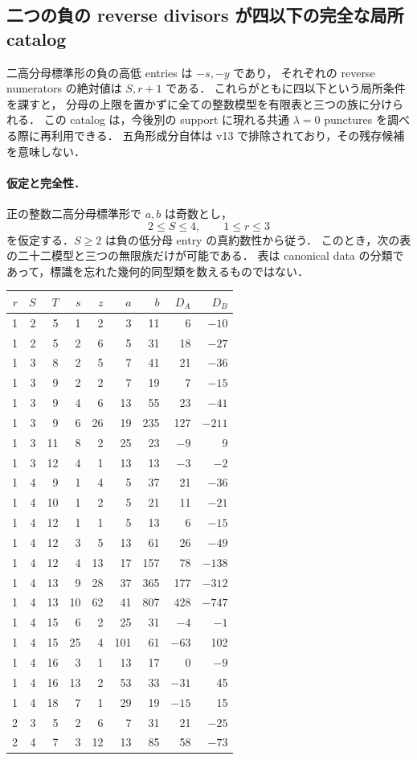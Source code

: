 \subsection{二つの負の reverse divisors が四以下の完全な局所 catalog}
\label{nr13:bounded-reverse}

二高分母標準形の負の高低 entries は $-s,-y$ であり，
それぞれの reverse numerators の絶対値は $S,r+1$ である．
これらがともに四以下という局所条件を課すと，
分母の上限を置かずに全ての整数模型を有限表と三つの族に分けられる．
この catalog は，今後別の support に現れる共通 $\lambda=0$ punctures を調べる際に再利用できる．
五角形成分自体は v13 で排除されており，その残存候補を意味しない．

\paragraph{仮定と完全性．}
正の整数二高分母標準形で $a,b$ は奇数とし，
\[
 2\leq S\leq4,\qquad 1\leq r\leq3
\]
を仮定する．$S\geq2$ は負の低分母 entry の真約数性から従う．
このとき，次の表の二十二模型と三つの無限族だけが可能である．
表は canonical data の分類であって，標識を忘れた幾何的同型類を数えるものではない．

\begin{center}
\small
\begin{tabular}{rrrrrrrrr}
$r$&$S$&$T$&$s$&$z$&$a$&$b$&$D_A$&$D_B$\\\hline
1&2&5&1&2&3&11&6&$-10$\\
1&2&5&2&6&5&31&18&$-27$\\
1&3&8&2&5&7&41&21&$-36$\\
1&3&9&2&2&7&19&7&$-15$\\
1&3&9&4&6&13&55&23&$-41$\\
1&3&9&6&26&19&235&127&$-211$\\
1&3&11&8&2&25&23&$-9$&9\\
1&3&12&4&1&13&13&$-3$&$-2$\\
1&4&9&1&4&5&37&21&$-36$\\
1&4&10&1&2&5&21&11&$-21$\\
1&4&12&1&1&5&13&6&$-15$\\
1&4&12&3&5&13&61&26&$-49$\\
1&4&12&4&13&17&157&78&$-138$\\
1&4&13&9&28&37&365&177&$-312$\\
1&4&13&10&62&41&807&428&$-747$\\
1&4&15&6&2&25&31&$-4$&$-1$\\
1&4&15&25&4&101&61&$-63$&102\\
1&4&16&3&1&13&17&0&$-9$\\
1&4&16&13&2&53&33&$-31$&45\\
1&4&18&7&1&29&19&$-15$&15\\
2&3&5&2&6&7&31&21&$-25$\\
2&4&7&3&12&13&85&58&$-73$
\end{tabular}
\end{center}

